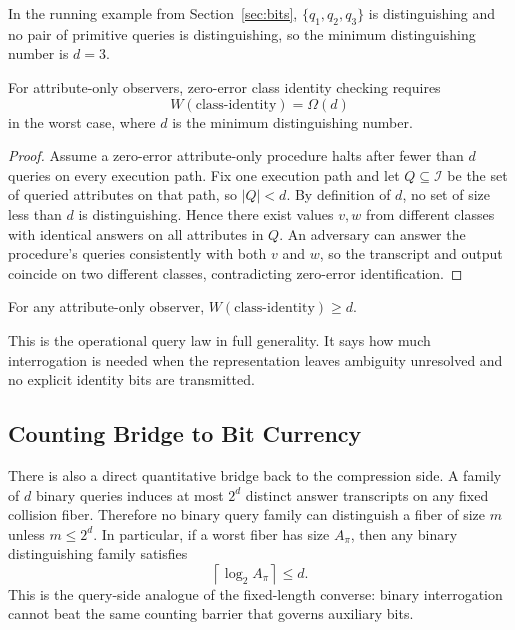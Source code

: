 In the running example from Section~\ref{sec:bits}, $\{q_1,q_2,q_3\}$ is distinguishing and no pair of primitive queries is distinguishing, so the minimum distinguishing number is $d=3$.

\begin{theorem}\label{thm:interface-lower-bound}
For attribute-only observers, zero-error class identity checking requires
\[
W(\text{class-identity}) = \Omega(d)
\]
in the worst case, where $d$ is the minimum distinguishing number.
\end{theorem}

\begin{proof}
Assume a zero-error attribute-only procedure halts after fewer than $d$ queries on every execution path. Fix one execution path and let $Q \subseteq \mathcal I$ be the set of queried attributes on that path, so $|Q|<d$. By definition of $d$, no set of size less than $d$ is distinguishing. Hence there exist values $v,w$ from different classes with identical answers on all attributes in $Q$. An adversary can answer the procedure's queries consistently with both $v$ and $w$, so the transcript and output coincide on two different classes, contradicting zero-error identification.
\end{proof}

\begin{corollary}\label{cor:attribute-only-witness-lb}
For any attribute-only observer, $W(\text{class-identity}) \ge d$.
\end{corollary}

This is the operational query law in full generality. It says how much interrogation is needed when the representation leaves ambiguity unresolved and no explicit identity bits are transmitted.

\subsection{Counting Bridge to Bit Currency}

There is also a direct quantitative bridge back to the compression side. A family of $d$ binary queries induces at most $2^d$ distinct answer transcripts on any fixed collision fiber. Therefore no binary query family can distinguish a fiber of size $m$ unless $m \le 2^d$. In particular, if a worst fiber has size $A_{\pi}$, then any binary distinguishing family satisfies
\[
\left\lceil \log_2 A_{\pi} \right\rceil \le d.
\]
This is the query-side analogue of the fixed-length converse: binary interrogation cannot beat the same counting barrier that governs auxiliary bits.

